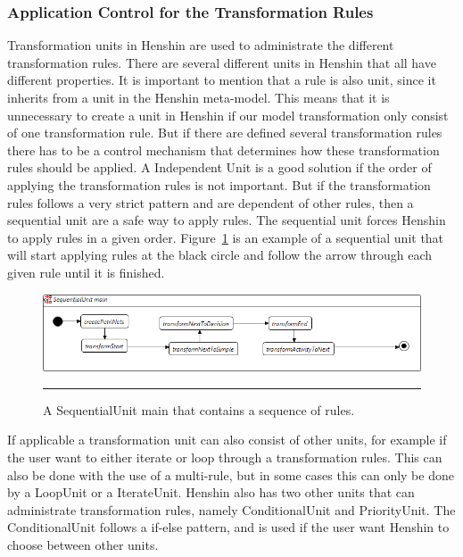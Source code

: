 \subsubsection*{Application Control for the Transformation Rules}
Transformation units in Henshin are used to administrate the different
transformation rules. There are several different units in Henshin that all have
different properties. It is important to mention that a rule is also unit,
since it inherits from a unit in the Henshin meta-model. This means that it is
unnecessary to create a unit in Henshin if our model transformation only
consist of one transformation rule. But if there are defined several
transformation rules there has to be a control mechanism that determines how
these transformation rules should be applied. A Independent Unit is a good
solution if the order of applying the transformation rules is not important.
But if the transformation rules follows a very strict pattern and are dependent
of other rules, then a sequential unit are a safe way to apply rules. The
sequential unit forces Henshin to apply rules in a given order.
Figure~\ref{fig:SequentialUnitHenshin} is an example of a sequential unit
that will start applying rules at the black circle and follow the arrow
through each given rule until it is finished.  

\begin{figure}[H]
	\centering
	\includegraphics[scale=0.5]{figures/SequentialUnitHenshin.png}
	\rule{35em}{0.5pt}
	\caption[A Sequential Unit in Henshin]
	{A SequentialUnit main that contains a sequence of rules.}
	\label{fig:SequentialUnitHenshin}
\end{figure}

If applicable a transformation unit can also consist of other units, for example
if the user want to either iterate or loop through a transformation rules. This
can also be done with the use of a multi-rule, but in some cases this can only
be done by a LoopUnit or a IterateUnit. Henshin also has two other units that
can administrate transformation rules, namely ConditionalUnit and PriorityUnit.
The ConditionalUnit follows a if-else pattern, and is used if the user want
Henshin to choose between other units. 

